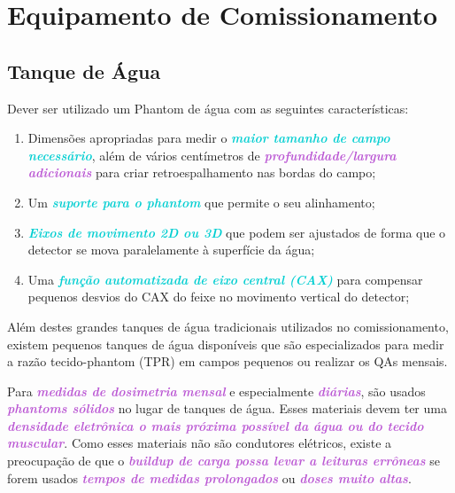 \documentclass[11pt,a4paper]{article}
\begin{document}
\section{Equipamento de Comissionamento}

\subsection*{Tanque de Água}

	Dever ser utilizado um Phantom de água com as seguintes características:

	\begin{enumerate}
		\item Dimensões apropriadas para medir o \textcolor{DarkTurquoise}{\textbf{\textit{maior tamanho de campo necessário}}}, além de vários centímetros de \textcolor{MediumOrchid}{\textbf{\textit{profundidade/largura adicionais}}} para criar retroespalhamento nas bordas do campo;
		\item Um \textcolor{DarkTurquoise}{\textbf{\textit{suporte para o phantom}}} que permite o seu alinhamento;
		\item \textcolor{DarkTurquoise}{\textbf{\textit{Eixos de movimento 2D ou 3D}}} que podem ser ajustados de forma que o detector se mova paralelamente à superfície da água;
		\item Uma \textcolor{DarkTurquoise}{\textbf{\textit{função automatizada de eixo central (CAX)}}} para compensar pequenos desvios do CAX do feixe no movimento vertical do detector;
	\end{enumerate}

	Além destes grandes tanques de água tradicionais utilizados no comissionamento, existem  pequenos tanques de água disponíveis que são especializados para medir a razão tecido-phantom (TPR) em campos pequenos ou realizar os QAs mensais.

	Para \textcolor{MediumOrchid}{\textbf{\textit{medidas de dosimetria mensal}}} e especialmente \textcolor{MediumOrchid}{\textbf{\textit{diárias}}}, são usados \textcolor{MediumOrchid}{\textbf{\textit{phantoms sólidos}}} no lugar de tanques de água. Esses materiais devem ter uma \textcolor{MediumOrchid}{\textbf{\textit{densidade eletrônica o mais próxima possível da água ou do tecido muscular}}}. Como esses materiais não são condutores elétricos, existe a preocupação de que o \textcolor{MediumOrchid}{\textbf{\textit{buildup de carga possa levar a leituras errôneas}}} se forem usados \textcolor{MediumOrchid}{\textbf{\textit{tempos de medidas prolongados}}} ou \textcolor{MediumOrchid}{\textbf{\textit{doses muito altas}}}. 
\end{document}
